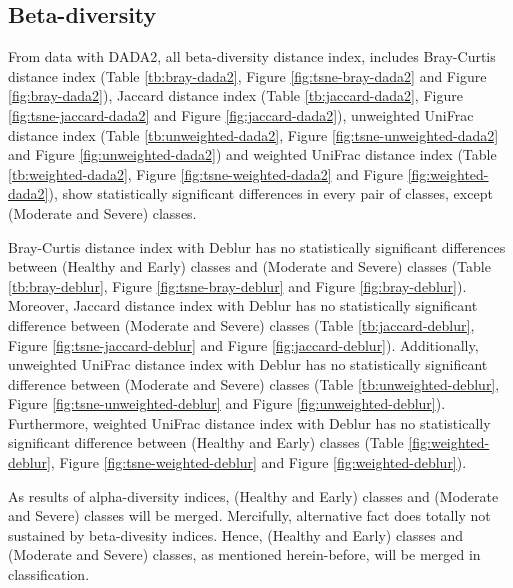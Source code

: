 \documentclass[a4paper]{article}
\begin{document}
{        \subsection{Beta-diversity}
            From data with DADA2, all beta-diversity distance index, includes Bray-Curtis distance index (Table \ref{tb:bray-dada2}, Figure \ref{fig:tsne-bray-dada2} and Figure \ref{fig:bray-dada2}), Jaccard distance index (Table \ref{tb:jaccard-dada2}, Figure \ref{fig:tsne-jaccard-dada2} and Figure \ref{fig:jaccard-dada2}), unweighted UniFrac distance index (Table \ref{tb:unweighted-dada2}, Figure \ref{fig:tsne-unweighted-dada2} and Figure \ref{fig:unweighted-dada2}) and weighted UniFrac distance index (Table \ref{tb:weighted-dada2}, Figure \ref{fig:tsne-weighted-dada2} and Figure \ref{fig:weighted-dada2}), show statistically significant differences in every pair of classes, except (Moderate and Severe) classes.

            Bray-Curtis distance index with Deblur has no statistically significant differences between (Healthy and Early) classes and (Moderate and Severe) classes (Table \ref{tb:bray-deblur}, Figure \ref{fig:tsne-bray-deblur} and Figure \ref{fig:bray-deblur}). Moreover, Jaccard distance index with Deblur has no statistically significant difference between (Moderate and Severe) classes (Table \ref{tb:jaccard-deblur}, Figure \ref{fig:tsne-jaccard-deblur} and Figure \ref{fig:jaccard-deblur}). Additionally, unweighted UniFrac distance index with Deblur has no statistically significant difference between (Moderate and Severe) classes (Table \ref{tb:unweighted-deblur}, Figure \ref{fig:tsne-unweighted-deblur} and Figure \ref{fig:unweighted-deblur}). Furthermore, weighted UniFrac distance index with Deblur has no statistically significant difference between (Healthy and Early) classes (Table \ref{fig:weighted-deblur}, Figure \ref{fig:tsne-weighted-deblur} and Figure \ref{fig:weighted-deblur}).

            As results of alpha-diversity indices, (Healthy and Early) classes and (Moderate and Severe) classes will be merged. Mercifully, alternative fact does totally not sustained by beta-divesity indices. Hence, (Healthy and Early) classes and (Moderate and Severe) classes, as mentioned herein-before, will be merged in classification.

}
\end{document}
